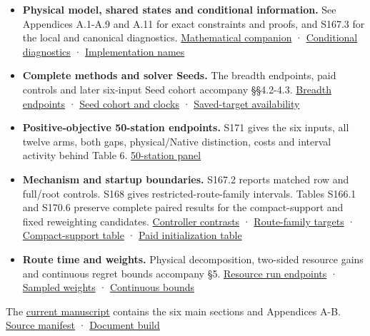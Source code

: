 \documentclass[
  american,
  11pt,
]{article}
\providecommand{\tightlist}{%
  \setlength{\itemsep}{0pt}\setlength{\parskip}{0pt}}
\begin{document}
\begin{itemize}
\tightlist
\item
  \textbf{Physical model, shared states and conditional information.}
  See Appendices A.1-A.9 and A.11 for exact constraints and proofs, and
  S167.3 for the local and canonical diagnostics.
  \href{https://github.com/yifanXovo/TailoredExact/blob/codex/round172-journal-manuscript/results/unified_exact_round137/mathematical_analysis.md}{Mathematical
  companion} ·
  \hyperref[s167.3-conditional-representation-diagnostics]{Conditional
  diagnostics} ·
  \hyperref[s167.4-historical-implementation-identity-navigation]{Implementation
  names}
\item
  \textbf{Complete methods and solver Seeds.} The breadth endpoints,
  paid controls and later six-input Seed cohort accompany §§4.2-4.3.
  \hyperref[breadth-complete-two-sided-endpoints]{Breadth endpoints} ·
  \hyperref[round164-completed-finite-solver-seed-evidence]{Seed cohort
  and clocks} ·
  \hyperref[all-pre-frozen-feasible-target-availability-intervals]{Saved-target
  availability}
\item
  \textbf{Positive-objective 50-station endpoints.} S171 gives the six
  inputs, all twelve arms, both gaps, physical/Native distinction, costs
  and interval activity behind Table 6.
  \hyperref[s171-positive-objective-50-station-configurations]{50-station
  panel}
\item
  \textbf{Mechanism and startup boundaries.} S167.2 reports matched row
  and full/root controls. S168 gives restricted-route-family intervals.
  Tables S166.1 and S170.6 preserve complete paired results for the
  compact-support and fixed reweighting candidates.
  \hyperref[s167.2-detailed-am-mechanism-and-earlier-seed-interpretation]{Controller
  contrasts} ·
  \hyperref[s168-complete-route-family-target-attainability]{Route-family
  targets} ·
  \hyperref[same-build-compact-support-endpoints]{Compact-support table}
  · \hyperref[matched-initialization-endpoints-by-role-and-seed]{Paid
  initialization table}
\item
  \textbf{Route time and weights.} Physical decomposition, two-sided
  resource gains and continuous regret bounds accompany §5.
  \hyperref[positive-resource-gi-tbc-operating-points]{Resource run
  endpoints} ·
  \hyperref[objective-weights-all-methods-and-decompositions]{Sampled
  weights} ·
  \hyperref[continuous-weight-archive-and-two-sided-resource-value]{Continuous
  bounds}
\end{itemize}

The
\href{https://github.com/yifanXovo/TailoredExact/blob/codex/round172-journal-manuscript/results/unified_exact_round137/manuscript.pdf}{current
manuscript} contains the six main sections and Appendices A-B.
\href{https://github.com/yifanXovo/TailoredExact/blob/codex/round172-journal-manuscript/results/unified_exact_round172/source_manifest.json}{Source
manifest} ·
\href{https://github.com/yifanXovo/TailoredExact/blob/codex/round172-journal-manuscript/results/unified_exact_round172/document_build.json}{Document
build}
\end{document}
